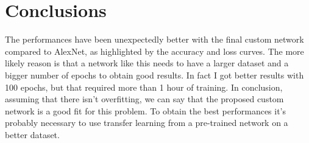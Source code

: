\documentclass[11pt]{article}
\begin{document}
	\section{Conclusions}
	The performances have been unexpectedly better with the final custom network compared
	to AlexNet, as highlighted by the accuracy and loss curves. The more likely reason
	is that a network like this needs to have a larger dataset and a bigger number
	of epochs to obtain good results. In fact I got better results with 100 epochs,
	but that required more than 1 hour of training.
	In conclusion, assuming that there isn't overfitting, we can say that the
	proposed custom network is a good fit for this problem. To obtain the best
	performances it's probably necessary to use transfer learning from a pre-trained
	network on a better dataset.
\end{document}
